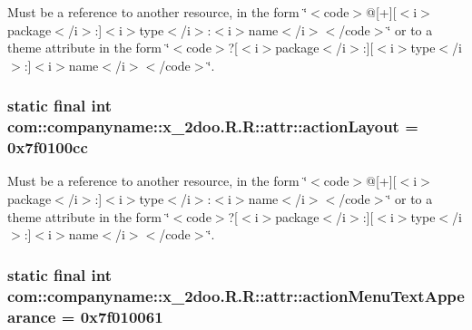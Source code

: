 Must be a reference to another resource, in the form \char`\"{}$<$code$>$@\mbox{[}+\mbox{]}\mbox{[}$<$i$>$package$<$/i$>$:\mbox{]}$<$i$>$type$<$/i$>$:$<$i$>$name$<$/i$>$$<$/code$>$\char`\"{} or to a theme attribute in the form \char`\"{}$<$code$>$?\mbox{[}$<$i$>$package$<$/i$>$:\mbox{]}\mbox{[}$<$i$>$type$<$/i$>$:\mbox{]}$<$i$>$name$<$/i$>$$<$/code$>$\char`\"{}. \hypertarget{classcom_1_1companyname_1_1x__2doo_1_1_r_1_1attr_bf0534b297193a5e88ef2feb45f936ca}{
\subsubsection[{actionLayout}]{\setlength{\rightskip}{0pt plus 5cm}static final int com::companyname::x\_\-2doo.R.R::attr::actionLayout = 0x7f0100cc}}
\label{classcom_1_1companyname_1_1x__2doo_1_1_r_1_1attr_bf0534b297193a5e88ef2feb45f936ca}


Must be a reference to another resource, in the form \char`\"{}$<$code$>$@\mbox{[}+\mbox{]}\mbox{[}$<$i$>$package$<$/i$>$:\mbox{]}$<$i$>$type$<$/i$>$:$<$i$>$name$<$/i$>$$<$/code$>$\char`\"{} or to a theme attribute in the form \char`\"{}$<$code$>$?\mbox{[}$<$i$>$package$<$/i$>$:\mbox{]}\mbox{[}$<$i$>$type$<$/i$>$:\mbox{]}$<$i$>$name$<$/i$>$$<$/code$>$\char`\"{}. \hypertarget{classcom_1_1companyname_1_1x__2doo_1_1_r_1_1attr_1a28aee481938a8a70bf5715b0402af9}{
\subsubsection[{actionMenuTextAppearance}]{\setlength{\rightskip}{0pt plus 5cm}static final int com::companyname::x\_\-2doo.R.R::attr::actionMenuTextAppearance = 0x7f010061}}
\label{classcom_1_1companyname_1_1x__2doo_1_1_r_1_1attr_1a28aee481938a8a70bf5715b0402af9}


